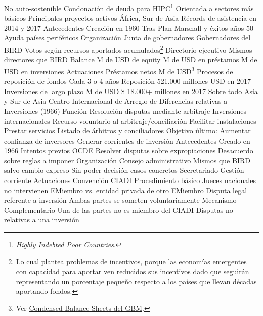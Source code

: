 \documentclass{nuevotema}
\begin{document}
\begin{esquemal}
				\4 No auto-sostenible
				\4 Condonación de deuda para HIPC\footnote{\textit{Highly Indebted Poor Countries}.}
				\4 Orientada a sectores más básicos
				\4 Principales proyectos activos
				\4[] África, Sur de Asia
				\4 Récords de asistencia en 2014 y 2017
			\3 Antecedentes
				\4 Creación en 1960
				\4 Tras Plan Marshall y éxitos años 50
				\4 Ayuda países periféricos
			\3 Organización
				\4 Junta de gobernadores
				\4[] Gobernadores del BIRD
				\4[] Votos según recursos aportados acumulados\footnote{Lo cual plantea problemas de incentivos, porque las economías emergentes con capacidad para aportar ven reducidos sus incentivos dado que seguirán representando un porcentaje pequeño respecto a los países que llevan décadas aportando fondos.}
				\4 Directorio ejecutivo
				\4[] Mismos directores que BIRD
				\4 Balance
				 M de USD de equity
				 M de USD en préstamos
				 M de USD en inversiones
			\3 Actuaciones
				\4 Préstamos netos
				 M de USD\footnote{Ver \href{https://finances.worldbank.org/Financial-Reporting/Condensed-Balance-Sheets/54xn-mzza/data}{Condensed Balance Sheets del GBM}.}
				\4 Procesos de reposición de fondos
				\4[] Cada 3 o 4 años
				\4[] Reposición 521.000 millones USD en 2017
				\4 Inversiones de largo plazo
				 M de USD
				\4 \$ 18.000+ millones en 2017
				\4 Sobre todo Asia y Sur de Asia
		\2 Centro Internacional de Arreglo de Diferencias relativas a Inversiones (1966)
			\3 Función
				\4 Resolución disputas mediante arbitraje
				\4[] Inversiones internacionales
				\4[] Recurso voluntario al arbitraje/conciliación
				\4 Facilitar instalaciones
				\4 Prestar servicios
				\4[] Listado de árbitros y conciliadores
				\4 Objetivo último:
				\4[] Aumentar confianza de inversores
				\4[] Generar corrientes de inversión
			\3 Antecedentes
				\4 Creado en 1966
				\4 Intentos previos OCDE
				\4[] Resolver disputas sobre expropiaciones
				\4[] Desacuerdo sobre reglas a imponer
			\3 Organización
				\4 Consejo administrativo
				\4[] Mismos que BIRD salvo cambio expreso
				\4[] Sin poder decisión casos concretos
				\4 Secretariado
				\4[] Gestión corriente
			\3 Actuaciones
				\4 Convención CIADI
				\4[] Procedimiento básico
				\4[] Jueces nacionales no intervienen
				\4[] EMiembro vs. entidad privada de otro EMiembro
				\4[] Disputa legal referente a inversión
				\4[] Ambas partes se someten voluntariamente
				\4 Mecanismo Complementario
				\4[] Una de las partes no es miembro del CIADI
				\4[] Disputas no relativas a una inversión

\end{esquemal}
\end{document}
